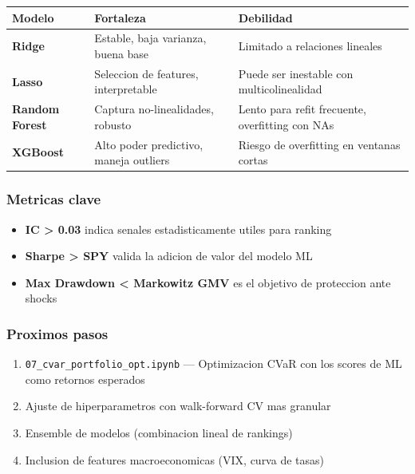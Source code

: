 \documentclass[11pt]{article}
\providecommand{\tightlist}{%
      \setlength{\itemsep}{0pt}\setlength{\parskip}{0pt}}
\begin{document}
{
\begin{longtable}[]{@{}
  >{\raggedright\arraybackslash}p{}
  >{\raggedright\arraybackslash}p{}
  >{\raggedright\arraybackslash}p{}@{}}
\toprule\noalign{}
\begin{minipage}[b]{\linewidth}\raggedright
Modelo
\end{minipage} & \begin{minipage}[b]{\linewidth}\raggedright
Fortaleza
\end{minipage} & \begin{minipage}[b]{\linewidth}\raggedright
Debilidad
\end{minipage} \\
\midrule\noalign{}
\endhead
\bottomrule\noalign{}
\endlastfoot
\textbf{Ridge} & Estable, baja varianza, buena base & Limitado a
relaciones lineales \\
\textbf{Lasso} & Seleccion de features, interpretable & Puede ser
inestable con multicolinealidad \\
\textbf{Random Forest} & Captura no-linealidades, robusto & Lento para
refit frecuente, overfitting con NAs \\
\textbf{XGBoost} & Alto poder predictivo, maneja outliers & Riesgo de
overfitting en ventanas cortas \\
\end{longtable}
}

\subsubsection{Metricas clave}\label{metricas-clave}

\begin{itemize}
\tightlist
\item
  \textbf{IC \textgreater{} 0.03} indica senales estadisticamente utiles
  para ranking
\item
  \textbf{Sharpe \textgreater{} SPY} valida la adicion de valor del
  modelo ML
\item
  \textbf{Max Drawdown \textless{} Markowitz GMV} es el objetivo de
  proteccion ante shocks
\end{itemize}

\subsubsection{Proximos pasos}\label{proximos-pasos}

\begin{enumerate}
\def\labelenumi{\arabic{enumi}.}
\tightlist
\item
  \texttt{07\_cvar\_portfolio\_opt.ipynb} --- Optimizacion CVaR con los
  scores de ML como retornos esperados
\item
  Ajuste de hiperparametros con walk-forward CV mas granular
\item
  Ensemble de modelos (combinacion lineal de rankings)
\item
  Inclusion de features macroeconomicas (VIX, curva de tasas)
\end{enumerate}


    
    
    
\end{document}
